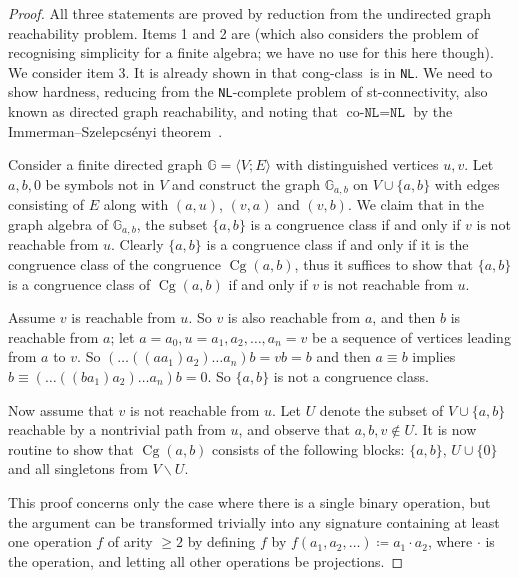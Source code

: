 \documentclass[10pt,a4paper]{amsart}
\theoremstyle{plain}
\theoremstyle{definition}
\newcommand{\congclass}{\textsf{cong-class}}
\newcommand{\Cg}{\operatorname{Cg}}
\begin{document}
\begin{proof}
All three statements are proved by reduction from the undirected graph reachability problem.  Items 1 and 2 are \cite[Theorem 3.5]{berslu02} (which also considers the problem of recognising simplicity for a finite algebra; we have no use for this here though).  
We consider item 3.  
It is already shown in \cite{berslu02} that \congclass\ is in  \texttt{NL}.  
We need to show hardness, reducing from the \texttt{NL}-complete problem of st-connectivity, also known as directed graph reachability, and noting that $\text{co-}\texttt{NL}=\texttt{NL}$ by the Immerman–Szelepcs\'{e}nyi theorem~\cite{imm}.

Consider a finite directed graph $\mathbb{G}=\langle V;E\rangle$ with distinguished vertices $u,v$.  Let $a,b,0$ be symbols not in $V$ and construct the graph $\mathbb{G}_{a,b}$ on $V\cup\{a,b\}$ with edges consisting of $E$ along with $(a,u)$, $(v,a)$ and $(v,b)$.  We claim that in the graph algebra of $\mathbb{G}_{a,b}$, the subset $\{a,b\}$ is a congruence class if and only if $v$ is not reachable from $u$.  Clearly $\{a,b\}$ is a congruence class if and only if it is the congruence class of the congruence $\Cg(a,b)$, thus it suffices to show that $\{a,b\}$ is a congruence class of $\Cg(a,b)$ if and only if $v$ is not reachable from $u$.

Assume $v$ is reachable from $u$.  So $v$ is also reachable from $a$, and then $b$ is reachable from $a$; let $a=a_0,u=a_1,a_2,\dots,a_n=v$ be a sequence of vertices leading from $a$ to $v$.  So $(\dots ((aa_1)a_2)\dots a_n)b=vb=b$ and then $a\equiv b$ implies $b\equiv (\dots ((ba_1)a_2)\dots a_n)b=0$.  So $\{a,b\}$ is not a congruence class.  

Now assume that $v$ is not reachable from $u$.  Let $U$ denote the subset of $V\cup\{a,b\}$ reachable by a nontrivial path from $u$, and observe that $a,b,v\notin U$.  It is now routine to show that $\Cg(a,b)$ consists of the following blocks: $\{a,b\}$, $U\cup\{0\}$ and all singletons from $V\backslash U$.

This proof concerns only the case where there is a single binary operation, but the argument can be transformed trivially into any signature containing at least one operation $f$ of arity $\geq 2$ by defining $f$ by $f(a_1,a_2,\dots)\coloneqq a_1\cdot a_2$, where $\cdot$ is the operation, and letting all other operations be projections.
\end{proof}
\end{document}
